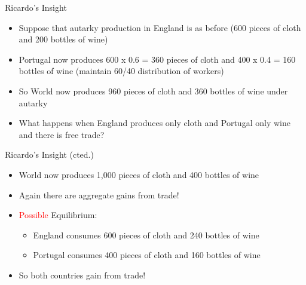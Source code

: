 \documentclass[10pt,hyperref={CJKbookmarks=true},xcolor=dvipsnames,aspectratio=169]{beamer}
\begin{document}
\begin{frame}{Ricardo’s Insight }

\begin{itemize}
\item Suppose that autarky production in England is as before (600 pieces
of cloth and 200 bottles of wine) 
\item Portugal now produces 600 x 0.6 = 360 pieces of cloth and 400 x 0.4
= 160 bottles of wine (maintain 60/40 distribution of workers) 
\item So World now produces 960 pieces of cloth and 360 bottles of wine
under autarky 
\item What happens when England produces only cloth and Portugal only wine
and there is free trade? 
\end{itemize}
\end{frame}

\begin{frame}{Ricardo’s Insight (cted.) }

\begin{itemize}
\item World now produces 1,000 pieces of cloth and 400 bottles of wine 
\item Again there are aggregate gains from trade! 
\item \textcolor{red}{Possible }Equilibrium: 

\begin{itemize}
\item England consumes 600 pieces of cloth and 240 bottles of wine 
\item Portugal consumes 400 pieces of cloth and 160 bottles of wine 
\end{itemize}
\item So both countries gain from trade! 
\end{itemize}
\end{frame}
\end{document}
